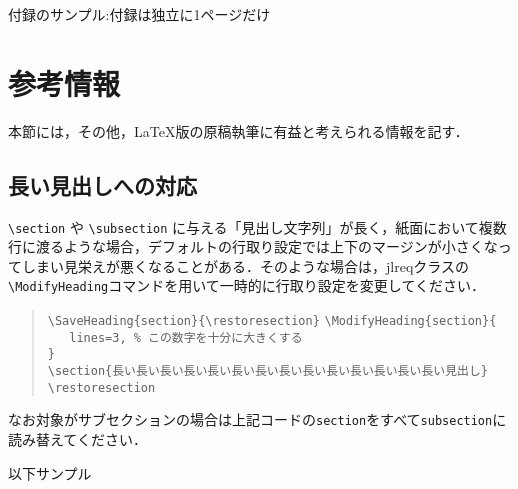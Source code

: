 \documentclass[
  platex, dvipdfmx,  %
]{nlp2024}
\newcommand{\code}[1]{\texttt{#1}}
\begin{document}


\clearpage
\appendix
{付録のサンプル:付録は独立に1ページだけ}
\section{参考情報}
本節には，その他，LaTeX版の原稿執筆に有益と考えられる情報を記す．


\subsection{長い見出しへの対応}
\verb|\section|
や
\verb|\subsection|
に与える「見出し文字列」が長く，紙面において複数行に渡るような場合，デフォルトの行取り設定では上下のマージンが小さくなってしまい見栄えが悪くなることがある．そのような場合は，jlreqクラスの \verb|\ModifyHeading|コマンドを用いて一時的に行取り設定を変更してください．

\begin{quote}
\verb|\SaveHeading{section}{\restoresection}|
\verb|\ModifyHeading{section}{|\\
\verb|   lines=3, % この数字を十分に大きくする|\\
\verb|}|\\
\verb|\section{長い長い長い長い長い長い長い長い長い長い長い長い長い長い見出し}|\\
\verb|\restoresection|
\end{quote}

なお対象がサブセクションの場合は上記コードの\code{section}をすべて\code{subsection}に読み替えてください．

以下サンプル
\end{document}
